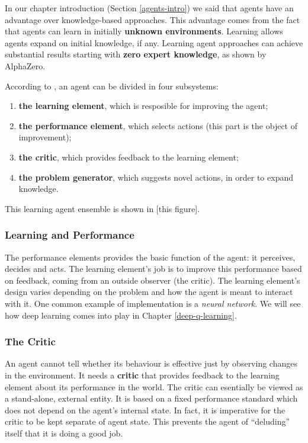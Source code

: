 In our chapter introduction (Section \ref{agents-intro}) we said that agents have an advantage over knowledge-based approaches.
This advantage comes from the fact that agents can learn in initially \textbf{unknown environments}.
Learning allows agents expand on initial knowledge, if any.
Learning agent approaches can achieve substantial results starting with \textbf{zero expert knowledge}, as shown by AlphaZero\cite{alpha-zero}.

According to \cite{aima}, an agent can be divided in four subsystems:
\begin{enumerate}
    \item \textbf{the learning element}, which is resposible for improving the agent;
    \item \textbf{the performance element}, which selects actions (this part is the object of improvement);
    \item \textbf{the critic}, which provides feedback to the learning element;
    \item \textbf{the problem generator}, which suggests novel actions, in order to expand knowledge.    
\end{enumerate}

This learning agent ensemble is shown in [this figure].

\subsubsection{Learning and Performance}
The performance elements provides the basic function of the agent: it perceives, decides and acts.
The learning element's job is to improve this performance based on feedback, coming from an outside observer (the critic).
The learning element's design varies depending on the problem and how the agent is meant to interact with it.
One common example of implementation is a \emph{neural network}.
We will see how deep learning comes into play in Chapter \ref{deep-q-learning}.

\subsubsection{The Critic}
An agent cannot tell whether its behaviour is effective just by observing changes in the environment.
It needs a \textbf{critic} that provides feedback to the learning element about its performance in the world.
The critic can esentially be viewed as a stand-alone, external entity.
It is based on a fixed performance standard which does not depend on the agent's internal state.
In fact, it is imperative for the critic to be kept separate of agent state.
This prevents the agent of ``deluding'' itself that it is doing a good job.

